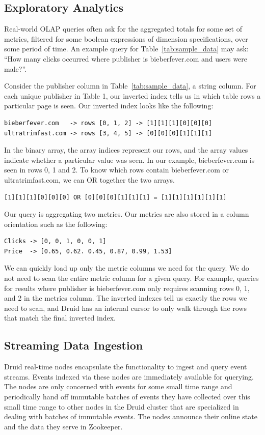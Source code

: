 \documentclass{vldb}
\begin{document}
\subsection{Exploratory Analytics}

Real-world OLAP queries often ask for the aggregated totals for some set of
metrics, filtered for some boolean expressions of dimension specifications,
over some period of time. An example query for Table~\ref{tab:sample_data} may
ask: “How many clicks occurred where publisher is bieberfever.com and users
were male?”. 

Consider the publisher column in Table~\ref{tab:sample_data}, a string column.
For each unique publisher in Table 1, our inverted index tells us in which
table rows a particular page is seen. Our inverted index looks like the
following:

{\small\begin{verbatim}
bieberfever.com   -> rows [0, 1, 2] -> [1][1][1][0][0][0]
ultratrimfast.com -> rows [3, 4, 5] -> [0][0][0][1][1][1]
\end{verbatim}}

In the binary array, the array indices represent our rows, and the array values
indicate whether a particular value was seen. In our example, bieberfever.com
is seen in rows 0, 1 and 2. To know which rows contain bieberfever.com or
ultratrimfast.com, we can OR together the two arrays.

{\small\begin{verbatim}
[1][1][1][0][0][0] OR [0][0][0][1][1][1] = [1][1][1][1][1][1]
\end{verbatim}}

Our query is aggregating two metrics. Our metrics are also stored in a column
orientation such as the following:

{\small\begin{verbatim}
Clicks -> [0, 0, 1, 0, 0, 1]
Price  -> [0.65, 0.62. 0.45, 0.87, 0.99, 1.53]
\end{verbatim}}

We can quickly load up only the metric columns we need for the query. We do not
need to scan the entire metric column for a given query. For example, queries
for results where publisher is bieberfever.com only requires scanning rows 0,
1, and 2 in the metrics column. The inverted indexes tell us exactly the rows
we need to scan, and Druid has an internal cursor to only walk through the rows
that match the final inverted index.

\subsection{Streaming Data Ingestion}
Druid real-time nodes encapsulate the functionality to ingest and query event
streams. Events indexed via these nodes are immediately available for querying.
The nodes are only concerned with events for some small time range and
periodically hand off immutable batches of events they have collected over this
small time range to other nodes in the Druid cluster that are specialized in
dealing with batches of immutable events. The nodes announce their online state
and the data they serve in Zookeeper\cite{hunt2010zookeeper}.
\end{document}
